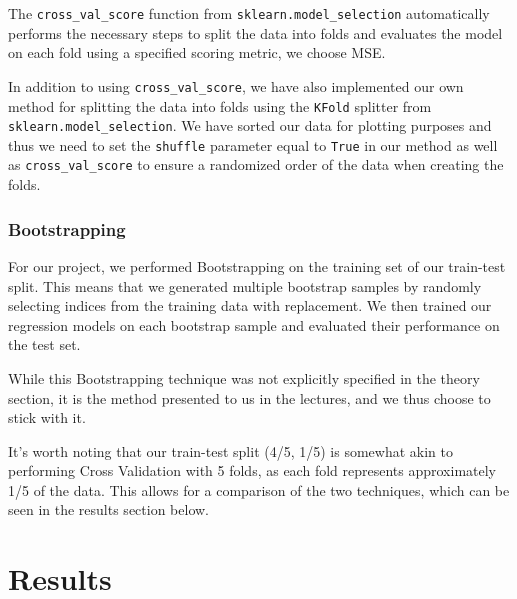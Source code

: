 \documentclass{article}
\begin{document}
The \verb|cross_val_score| function from \verb|sklearn.model_selection| automatically performs the necessary steps to split the data into folds and evaluates the model on each fold using a specified scoring metric, we choose MSE.

In addition to using \verb|cross_val_score|, we have also implemented our own method for splitting the data into folds using the \verb|KFold| splitter from \verb|sklearn.model_selection|. We have sorted our data for plotting purposes and thus we need to set the \verb|shuffle| parameter equal to \verb|True| in our method as well as \verb|cross_val_score| to ensure a randomized order of the data when creating the folds.


\subsubsection{Bootstrapping}
For our project, we performed Bootstrapping on the training set of our train-test split. This means that we generated multiple bootstrap samples by randomly selecting indices from the training data with replacement. We then trained our regression models on each bootstrap sample and evaluated their performance on the test set.

While this Bootstrapping technique was not explicitly specified in the theory section, it is the method presented to us in the lectures, and we thus choose to stick with it. 

It's worth noting that our train-test split (4/5, 1/5) is somewhat akin to performing Cross Validation with 5 folds, as each fold represents approximately 1/5 of the data. This allows for a comparison of the two techniques, which can be seen in the results section below.



\newpage

\section{Results}
\end{document}
